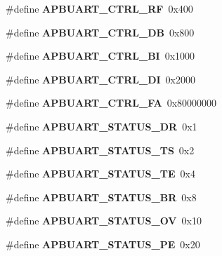 \begin{DoxyCompactItemize}
\#define {\bfseries A\+P\+B\+U\+A\+R\+T\+\_\+\+C\+T\+R\+L\+\_\+\+RF}~0x400
\item 
\mbox{\label{group__uart_ga10ce8cfc98a31f7fdc2d7fffd7fc40e7}} 
\#define {\bfseries A\+P\+B\+U\+A\+R\+T\+\_\+\+C\+T\+R\+L\+\_\+\+DB}~0x800
\item 
\mbox{\label{group__uart_ga0d51c54f8401c61639bbd31243f7d19e}} 
\#define {\bfseries A\+P\+B\+U\+A\+R\+T\+\_\+\+C\+T\+R\+L\+\_\+\+BI}~0x1000
\item 
\mbox{\label{group__uart_ga8589db1bde5338d5fcabb63e1a97c5d5}} 
\#define {\bfseries A\+P\+B\+U\+A\+R\+T\+\_\+\+C\+T\+R\+L\+\_\+\+DI}~0x2000
\item 
\mbox{\label{group__uart_ga90bd40e40b6cab1874a2223559a77c4c}} 
\#define {\bfseries A\+P\+B\+U\+A\+R\+T\+\_\+\+C\+T\+R\+L\+\_\+\+FA}~0x80000000
\item 
\mbox{\label{group__uart_ga02a90ac607d42bdf6447ef4fad1f366a}} 
\#define {\bfseries A\+P\+B\+U\+A\+R\+T\+\_\+\+S\+T\+A\+T\+U\+S\+\_\+\+DR}~0x1
\item 
\mbox{\label{group__uart_ga4bc9dbb00744253a5db09bec73b85a71}} 
\#define {\bfseries A\+P\+B\+U\+A\+R\+T\+\_\+\+S\+T\+A\+T\+U\+S\+\_\+\+TS}~0x2
\item 
\mbox{\label{group__uart_ga370a789f788097b853149647ad779328}} 
\#define {\bfseries A\+P\+B\+U\+A\+R\+T\+\_\+\+S\+T\+A\+T\+U\+S\+\_\+\+TE}~0x4
\item 
\mbox{\label{group__uart_gaf24ec60ea222464e7b6ea4626a1dd4b3}} 
\#define {\bfseries A\+P\+B\+U\+A\+R\+T\+\_\+\+S\+T\+A\+T\+U\+S\+\_\+\+BR}~0x8
\item 
\mbox{\label{group__uart_ga6ad0edb0126509ebeb54338f25294ebf}} 
\#define {\bfseries A\+P\+B\+U\+A\+R\+T\+\_\+\+S\+T\+A\+T\+U\+S\+\_\+\+OV}~0x10
\item 
\mbox{\label{group__uart_gaff4ee2b55a9003253511a7078a3cc335}} 
\#define {\bfseries A\+P\+B\+U\+A\+R\+T\+\_\+\+S\+T\+A\+T\+U\+S\+\_\+\+PE}~0x20
\item 

\end{DoxyCompactItemize}

